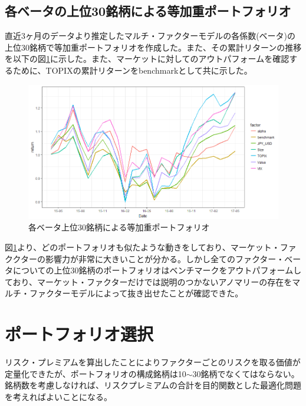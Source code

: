\documentclass[11pt]{jreport}
\begin{document}
\subsection{各ベータの上位30銘柄による等加重ポートフォリオ}
直近3ヶ月のデータより推定したマルチ・ファクターモデルの各係数(ベータ)の上位30銘柄で等加重ポートフォリオを作成した。また、その累計リターンの推移を以下の図\ref{fig:factor_top30}に示した。また、マーケットに対してのアウトパフォームを確認するために、TOPIXの累計リターンをbenchmarkとして共に示した。


\begin{figure}[H]
	\begin{center}
		\includegraphics[width=15cm]{./fig/factor_top30.png}
		\caption{各ベータ上位30銘柄による等加重ポートフォリオ}
		\label{fig:factor_top30}
	\end{center}
\end{figure}


図\ref{fig:factor_top30}より、どのポートフォリオも似たような動きをしており、マーケット・ファククターの影響力が非常に大きいことが分かる。しかし全てのファクター・ベータについての上位30銘柄のポートフォリオはベンチマークをアウトパフォームしており、マーケット・ファクターだけでは説明のつかないアノマリーの存在をマルチ・ファクターモデルによって抜き出せたことが確認できた。

\section{ポートフォリオ選択}
リスク・プレミアムを算出したことによりファクターごとのリスクを取る価値が定量化できたが、ポートフォリオの構成銘柄は10$\sim$30銘柄でなくてはならない。銘柄数を考慮しなければ、リスクプレミアムの合計を目的関数とした最適化問題を考えればよいことになる。
\end{document}
